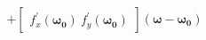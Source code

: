 \documentclass[preview]{standalone}
\begin{document}
\begin{align*}
+ \begin{bmatrix} f_x^{\prime}(\mathbf{\omega_0})\ f_y^{\prime}(\mathbf{\omega_0}) \end{bmatrix} (\mathbf{\omega} - \mathbf{\omega_0})
\end{align*}
\end{document}
